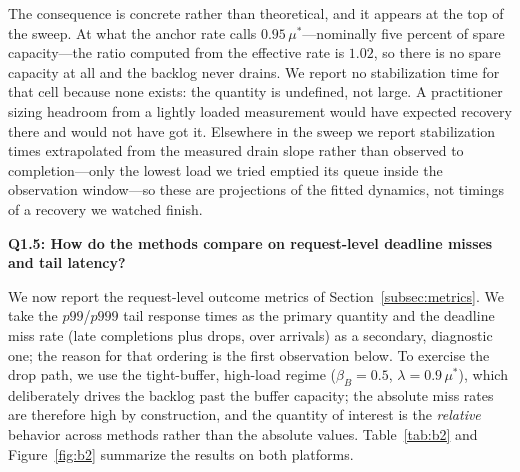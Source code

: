 \documentclass[conference]{IEEEtran}
\begin{document}
{{The consequence is concrete rather than theoretical, and it appears at the top of the sweep. At what the anchor rate calls $0.95\,\mu^{\ast}$---nominally five percent of spare capacity---the ratio computed from the effective rate is $1.02$, so there is no spare capacity at all and the backlog never drains. We report no stabilization time for that cell because none exists: the quantity is undefined, not large. A practitioner sizing headroom from a lightly loaded measurement would have expected recovery there and would not have got it. Elsewhere in the sweep we report stabilization times extrapolated from the measured drain slope rather than observed to completion---only the lowest load we tried emptied its queue inside the observation window---so these are projections of the fitted dynamics, not timings of a recovery we watched finish.}

{\color{navyblue}%
\vspace{0.5em}
\noindent\textbf{Q1.5: How do the methods compare on request-level deadline misses and tail latency?}

We now report the request-level outcome metrics of Section~\ref{subsec:metrics}. We take the $p99$/$p999$ tail response times as the primary quantity and the deadline miss rate (late completions plus drops, over arrivals) as a secondary, diagnostic one; the reason for that ordering is the first observation below. To exercise the drop path, we use the tight-buffer, high-load regime ($\beta_B=0.5$, $\lambda=0.9\,\mu^{\ast}$), which deliberately drives the backlog past the buffer capacity; the absolute miss rates are therefore high by construction, and the quantity of interest is the \emph{relative} behavior across methods rather than the absolute values. Table~\ref{tab:b2} and Figure~\ref{fig:b2} summarize the results on both platforms.

}}
\end{document}

